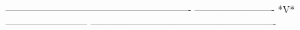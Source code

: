  
 
 
 
 
 
 
 
 
 
 
 
 
 
 
 
 
 
 
 
 
 
 
 
 
 
 
 
 
 
 
 
 
 
 
 
 
 
 
 
 
 
 
 
 
----------------------------------------------------------
-------------------------  *V*  --------------------------
----------------------------------------------------------
 
 
 
 
 
 
 
 
 
 
 
 
 
 
 
 
 
 
 
 
 
 
 
 
 
 
 
 
 
 
 
 
 
 
 
 
 
 
 
 
 
 
 
 
 
 
 
 
 
 
 
 
 
 
 
 
 
 
 
 
 
 
 
 
 
 
 
